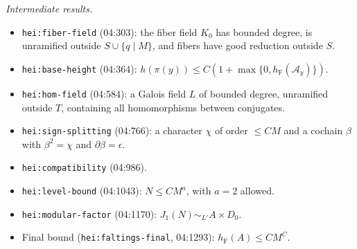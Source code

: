 \documentclass[11pt]{article}
\theoremstyle{definition}
\newcommand{\lbl}[1]{\texttt{#1}}
\newcommand{\src}[1]{\textsf{#1}}
\begin{document}
\emph{Intermediate results.}
\begin{itemize}
\item \lbl{hei:fiber-field} (\src{04:303}): the fiber field $K_0$ has
bounded degree, is unramified outside $S\cup\{q\mid M\}$, and fibers have
good reduction outside $S$.
\item \lbl{hei:base-height} (\src{04:364}):
$h(\pi(y))\le C(1+\max\{0,h_{\mathrm F}(\mathcal A_y)\})$.
\item \lbl{hei:hom-field} (\src{04:584}): a Galois field $L$ of bounded
degree, unramified outside $T$, containing all homomorphisms between
conjugates.
\item \lbl{hei:sign-splitting} (\src{04:766}): a character $\chi$ of order
$\le CM$ and a cochain $\beta$ with $\beta^2=\chi$ and $\partial\beta=\epsilon$.
\item \lbl{hei:compatibility} (\src{04:986}).
\item \lbl{hei:level-bound} (\src{04:1043}): $N\le CM^a$, with $a=2$ allowed.
\item \lbl{hei:modular-factor} (\src{04:1170}): $J_1(N)\sim_{L'}A\times D_0$.
\item Final bound (\lbl{hei:faltings-final}, \src{04:1293}):
$h_{\mathrm F}(A)\le CM^C$.
\end{itemize}
\end{document}
